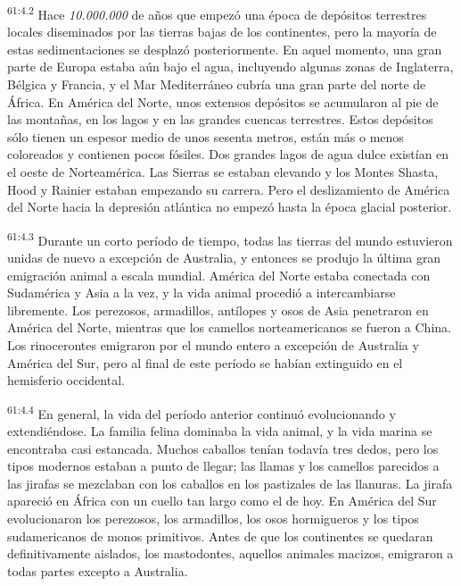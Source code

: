 \par
\textsuperscript{61:4.2} Hace \textit{10.000.000} de años que empezó una época de depósitos terrestres locales diseminados por las tierras bajas de los continentes, pero la mayoría de estas sedimentaciones se desplazó posteriormente. En aquel momento, una gran parte de Europa estaba aún bajo el agua, incluyendo algunas zonas de Inglaterra, Bélgica y Francia, y el Mar Mediterráneo cubría una gran parte del norte de África. En América del Norte, unos extensos depósitos se acumularon al pie de las montañas, en los lagos y en las grandes cuencas terrestres. Estos depósitos sólo tienen un espesor medio de unos sesenta metros, están más o menos coloreados y contienen pocos fósiles. Dos grandes lagos de agua dulce existían en el oeste de Norteamérica. Las Sierras se estaban elevando y los Montes Shasta, Hood y Rainier estaban empezando su carrera. Pero el deslizamiento de América del Norte hacia la depresión atlántica no empezó hasta la época glacial posterior.

\par
\textsuperscript{61:4.3} Durante un corto período de tiempo, todas las tierras del mundo estuvieron unidas de nuevo a excepción de Australia, y entonces se produjo la última gran emigración animal a escala mundial. América del Norte estaba conectada con Sudamérica y Asia a la vez, y la vida animal procedió a intercambiarse libremente. Los perezosos, armadillos, antílopes y osos de Asia penetraron en América del Norte, mientras que los camellos norteamericanos se fueron a China. Los rinocerontes emigraron por el mundo entero a excepción de Australia y América del Sur, pero al final de este período se habían extinguido en el hemisferio occidental.

\par
\textsuperscript{61:4.4} En general, la vida del período anterior continuó evolucionando y extendiéndose. La familia felina dominaba la vida animal, y la vida marina se encontraba casi estancada. Muchos caballos tenían todavía tres dedos, pero los tipos modernos estaban a punto de llegar; las llamas y los camellos parecidos a las jirafas se mezclaban con los caballos en los pastizales de las llanuras. La jirafa apareció en África con un cuello tan largo como el de hoy. En América del Sur evolucionaron los perezosos, los armadillos, los osos hormigueros y los tipos sudamericanos de monos primitivos. Antes de que los continentes se quedaran definitivamente aislados, los mastodontes, aquellos animales macizos, emigraron a todas partes excepto a Australia.

